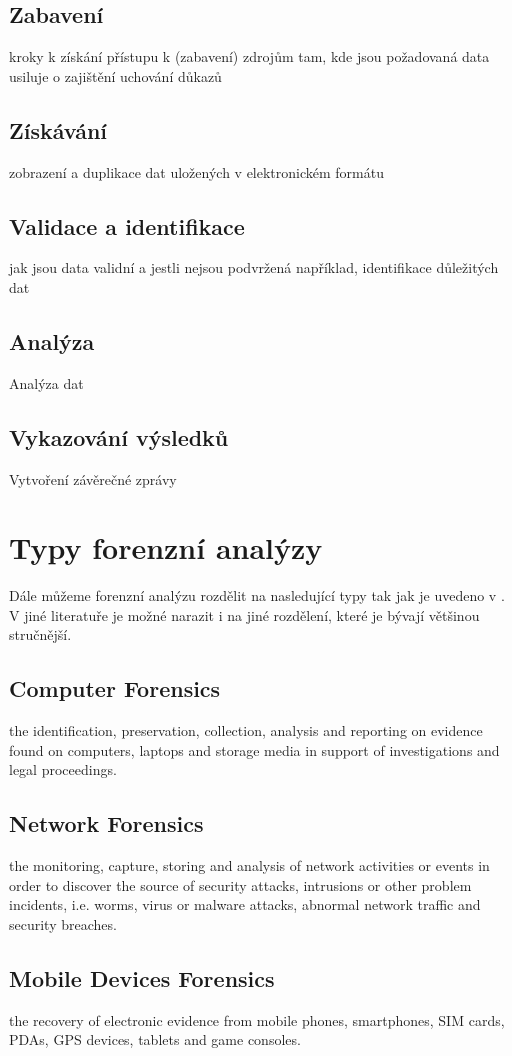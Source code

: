 \documentclass[thesis=B,czech]{FITthesis}[2012/06/26]
\begin{document}
\subsection{Zabavení}
kroky k získání přístupu k (zabavení) zdrojům tam, kde jsou požadovaná data\cite{for_sez}
usiluje o zajištění uchování důkazů
\subsection{Získávání}
zobrazení a duplikace dat uložených v elektronickém formátu
\subsection{Validace a identifikace}
jak jsou data validní a jestli nejsou podvržená například, identifikace důležitých dat
\subsection{Analýza}
Analýza dat
\subsection{Vykazování výsledků}
Vytvoření závěrečné zprávy



\section{Typy forenzní analýzy}
Dále můžeme forenzní analýzu rozdělit na nasledující typy tak jak je uvedeno v \cite{for_types}. V jiné literatuře je možné narazit i na jiné rozdělení, které je bývají většinou stručnější.

\subsection{Computer Forensics}
the identification, preservation, collection, analysis and reporting on evidence found on computers, laptops and storage media in support of investigations and legal proceedings.
\subsection{Network Forensics}
the monitoring, capture, storing and analysis of network activities or events in order to discover the source of security attacks, intrusions or other problem incidents, i.e. worms, virus or malware attacks, abnormal network traffic and security breaches.
\subsection{Mobile Devices Forensics}
the recovery of electronic evidence from mobile phones, smartphones, SIM cards, PDAs, GPS devices, tablets and game consoles.
\end{document}
